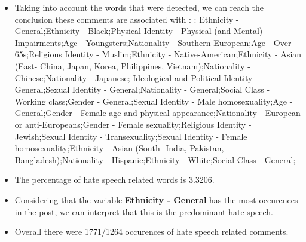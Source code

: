 \documentclass[11pt]{article}
\begin{document}
\begin{itemize}\item Taking into account the words that were detected, we can reach the conclusion these comments are associated with : : Ethnicity - General;Ethnicity - Black;Physical Identity - Physical (and Mental) Impairments;Age - Youngsters;Nationality - Southern European;Age - Over 65s;Religious Identity - Muslim;Ethnicity - Native-American;Ethnicity - Asian (East- China, Japan, Korea, Philippines, Vietnam);Nationality - Chinese;Nationality - Japanese; Ideological and Political Identity - General;Sexual Identity - General;Nationality - General;Social Class - Working class;Gender - General;Sexual Identity - Male homosexuality;Age - General;Gender - Female age and physical appearance;Nationality - European or anti-Europeans;Gender - Female sexuality;Religious Identity - Jewish;Sexual Identity - Transexuality;Sexual Identity - Female homosexuality;Ethnicity - Asian (South- India, Pakistan, Bangladesh);Nationality - Hispanic;Ethnicity - White;Social Class - General;%

\item The percentage of hate speech related words is 3.3206.

\item Considering that the variable \textbf{Ethnicity - General} has the most occurences in the post, we can interpret that this is the predominant hate speech.

\item Overall there were 1771/1264 occurences of hate speech related comments.\end{itemize}
\end{document}
